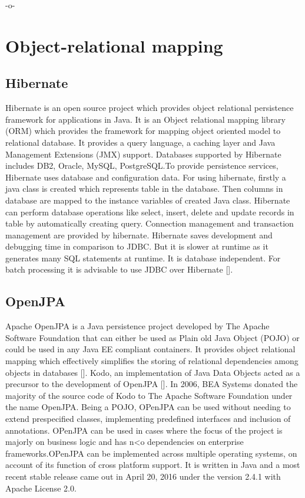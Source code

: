      -o-

\section{Object-relational mapping}
\label{S:o-db-object}

\subsection{Hibernate}

Hibernate is an open source project which provides object relational
persistence framework for applications in Java. It is an Object
relational mapping library (ORM) which provides the framework for
mapping object oriented model to relational database. It provides a
query language, a caching layer and Java Management Extensions (JMX)
support. Databases supported by Hibernate includes DB2, Oracle, MySQL,
PostgreSQL.To provide persistence services, Hibernate uses database
and configuration data. For using hibernate, firstly a java class is
created which represents table in the database. Then columns in
database are mapped to the instance variables of created Java
class. Hibernate can perform database operations like select, insert,
delete and update records in table by automatically creating
query. Connection management and transaction management are provided
by hibernate.  Hibernate saves development and debugging time in
comparison to JDBC.  But it is slower at runtime as it generates many
SQL statements at runtime. It is database independent. For batch
processing it is advisable to use JDBC over
Hibernate [\cite{www-hibernate}].

\subsection{OpenJPA}

Apache OpenJPA is a Java persistence project developed by The Apache
Software Foundation that can either be used as Plain old Java Object
(POJO) or could be used in any Java EE compliant containers. It
provides object relational mapping which effectively simplifies the
storing of relational dependencies among objects in
databases [\cite{www-openjpa}].  Kodo, an implementation of Java Data
Objects acted as a precursor to the development of
OpenJPA [\cite{www-openjpa-wiki}]. In 2006, BEA Systems donated the
majority of the source code of Kodo to The Apache Software Foundation
under the name OpenJPA. Being a POJO, OPenJPA can be used without
needing to extend prespecified classes, implementing predefined
interfaces and inclusion of annotations. OPenJPA can be used in cases
where the focus of the project is majorly on business logic and has
n<o dependencies on enterprise frameworks.OPenJPA can be implemented
across multiple operating systems, on account of its function of cross
platform support. It is written in Java and a most recent stable
release came out in April 20, 2016 under the version 2.4.1 with Apache
License 2.0.

